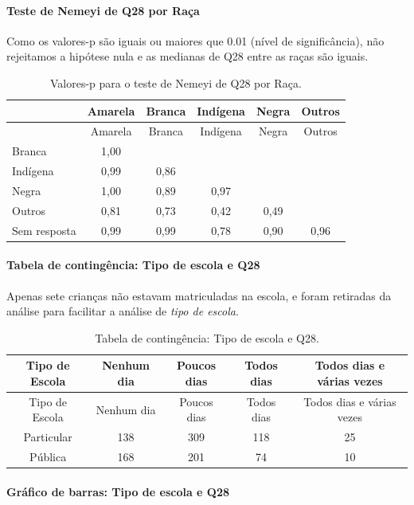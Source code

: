 \documentclass[]{article}
\let\oldparagraph\paragraph
\renewcommand{\paragraph}[1]{\oldparagraph{#1}\mbox{}}
\begin{document}
\hypertarget{teste-de-nemeyi-de-q28-por-rauxe7a}{%
\paragraph{Teste de Nemeyi de Q28 por Raça}\label{teste-de-nemeyi-de-q28-por-rauxe7a}}

Como os valores-p são iguais ou maiores que 0.01 (nível de significância), não rejeitamos a hipótese nula e as medianas de Q28 entre as raças são iguais.

\begin{longtable}[]{@{}lccccc@{}}
\caption{\label{tab:unnamed-chunk-878}Valores-p para o teste de Nemeyi de Q28 por Raça.}\tabularnewline
\toprule
& Amarela & Branca & Indígena & Negra & Outros\tabularnewline
\midrule
\endfirsthead
\toprule
& Amarela & Branca & Indígena & Negra & Outros\tabularnewline
\midrule
\endhead
Branca & 1,00 & & & &\tabularnewline
Indígena & 0,99 & 0,86 & & &\tabularnewline
Negra & 1,00 & 0,89 & 0,97 & &\tabularnewline
Outros & 0,81 & 0,73 & 0,42 & 0,49 &\tabularnewline
Sem resposta & 0,99 & 0,99 & 0,78 & 0,90 & 0,96\tabularnewline
\bottomrule
\end{longtable}

\cleardoublepage

\hypertarget{tabela-de-continguxeancia-tipo-de-escola-e-q28}{%
\paragraph{Tabela de contingência: Tipo de escola e Q28}\label{tabela-de-continguxeancia-tipo-de-escola-e-q28}}

Apenas sete crianças não estavam matriculadas na escola, e foram retiradas da análise para facilitar a análise de \emph{tipo de escola}.

\begin{longtable}[]{@{}ccccc@{}}
\caption{\label{tab:unnamed-chunk-879}Tabela de contingência: Tipo de escola e Q28.}\tabularnewline
\toprule
Tipo de Escola & Nenhum dia & Poucos dias & Todos dias & Todos dias e várias vezes\tabularnewline
\midrule
\endfirsthead
\toprule
Tipo de Escola & Nenhum dia & Poucos dias & Todos dias & Todos dias e várias vezes\tabularnewline
\midrule
\endhead
Particular & 138 & 309 & 118 & 25\tabularnewline
Pública & 168 & 201 & 74 & 10\tabularnewline
\bottomrule
\end{longtable}

\hypertarget{gruxe1fico-de-barras-tipo-de-escola-e-q28}{%
\paragraph{Gráfico de barras: Tipo de escola e Q28}\label{gruxe1fico-de-barras-tipo-de-escola-e-q28}}
\end{document}
